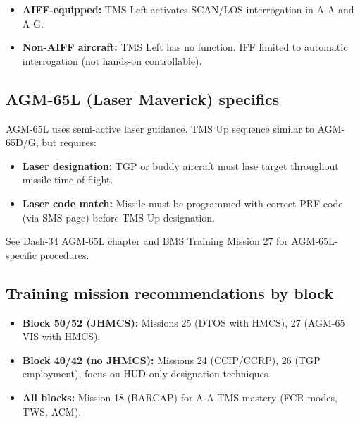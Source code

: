 \documentclass[11pt, a4paper, twoside]{report}
\begin{document}
\begin{itemize}
    \item \textbf{AIFF-equipped:} TMS Left activates SCAN/LOS interrogation in A-A and A-G.
    \item \textbf{Non-AIFF aircraft:} TMS Left has no function. IFF limited to automatic interrogation (not hands-on controllable).
\end{itemize}

\subsection{AGM-65L (Laser Maverick) specifics}
\label{sec:C4-S6-S3}

AGM-65L uses semi-active laser guidance. TMS Up sequence similar to AGM-65D/G, but requires:
\begin{itemize}
    \item \textbf{Laser designation:} TGP or buddy aircraft must lase target throughout missile time-of-flight.
    \item \textbf{Laser code match:} Missile must be programmed with correct PRF code (via SMS page) before TMS Up designation.
\end{itemize}

See Dash-34 AGM-65L chapter and BMS Training Mission 27 for AGM-65L-specific procedures.

\subsection{Training mission recommendations by block}
\label{sec:C4-S6-S4}

\begin{itemize}
    \item \textbf{Block 50/52 (JHMCS):} Missions 25 (DTOS with HMCS), 27 (AGM-65 VIS with HMCS).
    \item \textbf{Block 40/42 (no JHMCS):} Missions 24 (CCIP/CCRP), 26 (TGP employment), focus on HUD-only designation techniques.
    \item \textbf{All blocks:} Mission 18 (BARCAP) for A-A TMS mastery (FCR modes, TWS, ACM).
\end{itemize}

\end{document}
